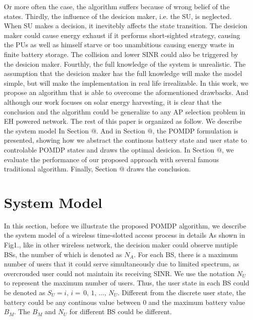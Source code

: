 \documentclass[conference]{IEEEtran}
\makeatletter
\newcommand{\Rmnum}[1]{\expandafter\@slowromancap\romannumeral #1@}
\makeatother
\begin{document}
Or more often the case, the algorithm suffers because of wrong belief of the states.
Thirdly, the influence of the desicion maker, i.e. the SU, is neglected.
When SU makes a decision, it inevitebly affects the state transition. 
The desicion maker could cause energy exhaust if it performs short-sighted strategy,
causing the PUs as well as himself starve or too unambitious causing energy waste in finite battery storage.
The collision and lower SINR could also be triggered by the desicion maker.
Fourthly, the full knowledge of the system is unrealistic.
The assumption that the desicion maker has the full knowledge will make the model simple, 
but will make the implementation in real life irrealizable.
In this work, we propose an algorithm that is able to overcome the aformentioned drawbacks.
And although our work focuses on solar energy harvesting,
it is clear that the conclusion and the algorithm could be generalize to any AP selection problem in EH powered network.
The rest of this paper is organized as follow. 
We describe the system model In Section \Rmnum{2}. 
And in Section \Rmnum{3}, the POMDP formulation is presented, 
showing how we abstract the continous battery state and user state to 
controlable POMDP states and draws the optimal desicion.
In Section \Rmnum{4}, we evaluate the performance of our proposed approach with several famous traditional algorithm. 
Finally, Section \Rmnum{5} draws the conclusion.
\section{System Model}
In this section, before we illustrate the proposed POMDP algorithm, 
we describe the system model of a wireless time-slotted access process in details 
As shown in Fig1., like in other wireless network, 
the decision maker could observe mutiple BSs, the number of which is denoted as \(N_A\).
For each BS, there is a maximum number of users that it could serve simultaneously due to limited spectrum, 
as overcrouded user could not maintain its receiving SINR. 
We use the notation \(N_U\) to represent the maximum number of users.
Thus, the user state in each BS could be denoted as \(S_U = i,\, i = \,0,\,1,\,...,\,N_U\).
Different from the discrete user state, the battery could be any continous value between \(0\) 
and the maximum battery value \(B_M\). The \(B_M\) and \(N_U\) for different BS could be different.\\
\end{document}
